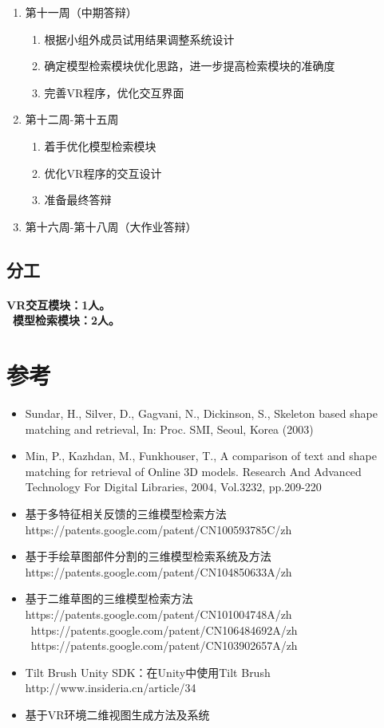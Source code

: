 \documentclass{article}
\begin{document}
\begin{enumerate}
\begin{enumerate}
    \end{enumerate}
    \item 第十一周（中期答辩）
    \begin{enumerate}
        \item 根据小组外成员试用结果调整系统设计
        \item 确定模型检索模块优化思路，进一步提高检索模块的准确度
        \item 完善VR程序，优化交互界面
    \end{enumerate}
    \item 第十二周-第十五周
    \begin{enumerate}
        \item 着手优化模型检索模块
        \item 优化VR程序的交互设计
        \item 准备最终答辩
    \end{enumerate}
    \item 第十六周-第十八周（大作业答辩）
\end{enumerate}
\subsection{分工}
\paragraph{VR交互模块：1人。 \\\ 模型检索模块：2人。
}

\section{参考}
\begin{itemize}
    \item Sundar, H., Silver, D., Gagvani, N., Dickinson, S., Skeleton based shape matching and retrieval, In: Proc. SMI, Seoul, Korea (2003)
    \item Min, P., Kazhdan, M., Funkhouser, T., A comparison of text and shape matching for retrieval of Online 3D models. Research And Advanced Technology For Digital Libraries, 2004, Vol.3232, pp.209-220
    \item 基于多特征相关反馈的三维模型检索方法 https://patents.google.com/patent/CN100593785C/zh
    \item 基于手绘草图部件分割的三维模型检索系统及方法 https://patents.google.com/patent/CN104850633A/zh
    \item 基于二维草图的三维模型检索方法 https://patents.google.com/patent/CN101004748A/zh \\\ https://patents.google.com/patent/CN106484692A/zh \\\ https://patents.google.com/patent/CN103902657A/zh
    \item Tilt Brush Unity SDK：在Unity中使用Tilt Brush http://www.insideria.cn/article/34
    \item 基于VR环境二维视图生成方法及系统

\end{itemize}
\end{document}
